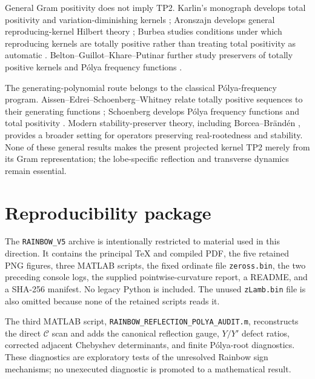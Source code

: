 \documentclass[11pt]{amsart}
\numberwithin{equation}{section}
\theoremstyle{plain}
\theoremstyle{definition}
\theoremstyle{remark}
\newcommand{\Ccal}{\mathcal C}
\begin{document}
General Gram positivity does not imply TP2.  Karlin's monograph develops total positivity and variation-diminishing kernels \cite{Karlin1968}; Aronszajn develops general reproducing-kernel Hilbert theory \cite{Aronszajn1950}; Burbea studies conditions under which reproducing kernels are totally positive rather than treating total positivity as automatic \cite{Burbea1974,Burbea1976}.  Belton--Guillot--Khare--Putinar further study preservers of totally positive kernels and Pólya frequency functions \cite{Belton2022}.

The generating-polynomial route belongs to the classical Pólya-frequency program.  Aissen--Edrei--Schoenberg--Whitney relate totally positive sequences to their generating functions \cite{Aissen1951}; Schoenberg develops Pólya frequency functions and total positivity \cite{Schoenberg1951}.  Modern stability-preserver theory, including Borcea--Brändén \cite{BorceaBranden2009}, provides a broader setting for operators preserving real-rootedness and stability.  None of these general results makes the present projected kernel TP2 merely from its Gram representation; the lobe-specific reflection and transverse dynamics remain essential.

\section{Reproducibility package}
\label{sec:reproducibility}

The \texttt{RAINBOW\_V5} archive is intentionally restricted to material used in this direction.  It contains the principal TeX and compiled PDF, the five retained PNG figures, three MATLAB scripts, the fixed ordinate file \texttt{zeross.bin}, the two preceding console logs, the supplied pointwise-curvature report, a README, and a SHA-256 manifest.  No legacy Python is included.  The unused \texttt{zLamb.bin} file is also omitted because none of the retained scripts reads it.

The third MATLAB script, \texttt{RAINBOW\_REFLECTION\_POLYA\_AUDIT.m}, reconstructs the direct $\Ccal$ scan and adds the canonical reflection gauge, $Y/Y'$ defect ratios, corrected adjacent Chebyshev determinants, and finite Pólya-root diagnostics.  These diagnostics are exploratory tests of the unresolved Rainbow sign mechanisms; no unexecuted diagnostic is promoted to a mathematical result.
\end{document}

